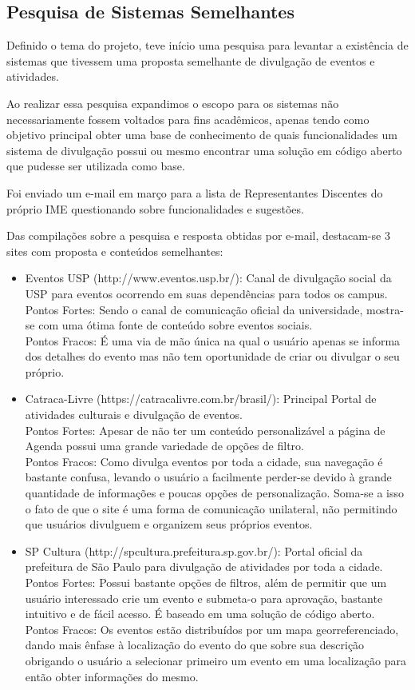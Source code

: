 \subsection{Pesquisa de Sistemas Semelhantes}
\par Definido o tema do projeto, teve início uma pesquisa para levantar a existência de sistemas que tivessem uma proposta semelhante de divulgação de eventos e atividades.
\par Ao realizar essa pesquisa expandimos o escopo para os sistemas não necessariamente fossem voltados para fins acadêmicos, apenas tendo como objetivo principal obter uma base de conhecimento de quais funcionalidades um sistema de divulgação possui ou mesmo encontrar uma solução em código aberto que pudesse ser utilizada como base.
 \par Foi enviado um e-mail em março para a lista de Representantes Discentes do próprio IME questionando sobre funcionalidades e sugestões.
\par Das compilações sobre a pesquisa e resposta obtidas por e-mail, destacam-se 3 sites com proposta e conteúdos semelhantes:
\begin{itemize}
\item{Eventos USP (http://www.eventos.usp.br/):}
Canal de divulgação social da USP para eventos ocorrendo em suas dependências para todos os campus.\\
Pontos Fortes: Sendo o canal de comunicação oficial da universidade, mostra-se com uma ótima fonte de conteúdo sobre eventos sociais.\\
Pontos Fracos: É uma via de mão única na qual o usuário apenas se informa dos detalhes do evento mas não tem oportunidade de criar ou divulgar o seu próprio.
\item {Catraca-Livre (https://catracalivre.com.br/brasil/):} Principal Portal de atividades culturais e divulgação de eventos.\\
Pontos Fortes: Apesar de não ter um conteúdo personalizável a página de Agenda possui uma grande variedade de opções de filtro.\\
Pontos Fracos: Como divulga eventos por toda a cidade, sua navegação é bastante confusa, levando o usuário a facilmente perder-se devido à grande quantidade de informações e poucas opções de personalização. Soma-se a isso o fato de que o site é uma forma de comunicação unilateral, não permitindo que usuários divulguem e organizem seus próprios eventos.
\item {SP Cultura (http://spcultura.prefeitura.sp.gov.br/):} Portal oficial da prefeitura de São Paulo para divulgação de atividades por toda a cidade.\\
Pontos Fortes: Possui bastante opções de filtros, além de permitir que um usuário interessado crie um evento e submeta-o para aprovação, bastante intuitivo e de fácil acesso. É baseado em uma solução de código aberto.\\
Pontos Fracos: Os eventos estão distribuídos por um mapa georreferenciado, dando mais ênfase à localização do evento do que sobre sua descrição obrigando o usuário a selecionar primeiro um evento em uma localização para então obter informações do mesmo.
\end{itemize}
